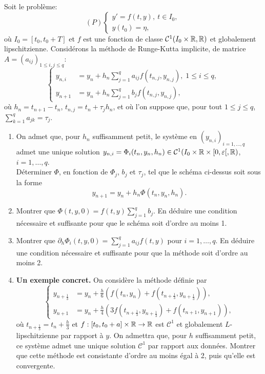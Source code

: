 \documentclass[a4paper,12pt,reqno]{amsart}
\begin{document}


\begin{exo}\label{exo:RKI}

  Soit le problème:
  \[(P)
  \begin{cases}
  y'=f(t,y),\ t\in I_0,\\
  y(t_0)=\eta,
  \end{cases}
  \]
  où $I_0=[t_0,t_0+T]$ et $f$ est une fonction de classe $\mathcal{C}^1(I_0\times\mathbb{R},\mathbb{R})$ et globalement lipschitzienne. Considérons la méthode de Runge-Kutta implicite, de matrice $A=(a_{ij})_{1\leq i,j\leq q}$:
  \[
    \left\{
      \begin{aligned}
        y_{n,i} &= y_n + h_n\sum_{j=1}^q a_{ij}f(t_{n,j},y_{n,j}), \; 1\leq i\leq q,\\
        y_{n+1} &= y_n + h_n\sum_{j=1}^q b_jf(t_{n,j},y_{n,j}),
      \end{aligned}
    \right.
  \]
  où $h_n = t_{n+1} - t_n$, $t_{n,j} = t_n+ \tau_j h_n$, et où l'on suppose que, pour tout $1 \leq j \leq q$, $\displaystyle \sum_{k=1}^q a_{jk}=\tau_j$.

  \begin{enumerate}
    \item On admet que, pour $h_n$ suffisamment petit, le système en $(y_{n,i})_{i=1,\ldots,q}$ admet une unique solution $y_{n,i}=\Phi_i(t_n,y_n,h_n) \in \mathcal{C}^1(I_0 \times \mathbb{R} \times [0,\varepsilon[, \mathbb{R})$, $i=1,\ldots,q$.\\
    Déterminer $\Phi$, en fonction de $\Phi_j$, $b_j$ et $\tau_j$, tel que le schéma ci-dessus soit sous la forme \[y_{n+1} = y_{n} + h_n \Phi (t_n,y_n,h_n).\]

    \item Montrer que $\displaystyle \Phi(t,y,0) = f(t,y) \sum_{j=1}^q b_j$. En déduire une condition nécessaire et suffisante pour que le schéma soit d'ordre au moins 1.

    \item Montrer que $\partial_{h} \Phi_{i} (t,y,0) = \sum_{j=1}^{q} a_{ij}f(t,y)$ pour $i=1,\ldots,q$. En déduire une condition nécessaire et suffisante pour que la méthode soit d'ordre au moins 2.

    \item {\bf Un exemple concret.} On considère la méthode définie par
    \[
      \left\{
        \begin{aligned}
          y_{n+\frac{1}{3}} & = y_n + \frac{h}{6}\left(f(t_n,y_n) +  f(t_{n+\frac{1}{3}},y_{n+\frac{1}{3}})\right), \\
          y_{n+1} & = y_n + \frac{h}{4} \left(3f(t_{n+\frac{1}{3}},y_{n+\frac{1}{3}})+ f(t_{n+1},y_{n+1})\right),
        \end{aligned}
      \right.
    \]
    où $t_{n+\frac{1}{3}} = t_{n}+\frac{h}{3}$ et $f:[t_0,t_0+a]\times\mathbb{R}\rightarrow\mathbb{R}$ est $\mathcal{C}^1$ et globalement $L$-lipschitzienne par rapport à $y$. On admettra que, pour $h$ suffisamment petit, ce système admet une unique solution $\mathcal{C}^{1}$ par rapport aux données. Montrer que cette méthode est consistante d'ordre au moins égal à 2, puis qu'elle est convergente.
  \end{enumerate}



\end{exo}
\end{document}
